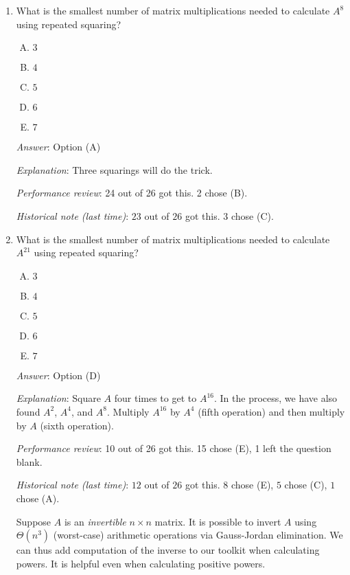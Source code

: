 \documentclass[10pt]{amsart}
\begin{document}
\begin{enumerate}
  {\em Historical note (last time)}: $21$ out of $26$ got this. $3$ chose (C),
  $2$ chose (A).
\item What is the smallest number of matrix multiplications needed to
  calculate $A^8$ using repeated squaring?

  \begin{enumerate}[(A)]
  \item $3$
  \item $4$
  \item $5$
  \item $6$
  \item $7$
  \end{enumerate}

  {\em Answer}: Option (A)

  {\em Explanation}: Three squarings will do the trick.

  {\em Performance review}: 24 out of 26 got this. 2 chose (B).

  {\em Historical note (last time)}: $23$ out of $26$ got this. $3$ chose (C).

\item What is the smallest number of matrix multiplications needed to
  calculate $A^{21}$ using repeated squaring?

  \begin{enumerate}[(A)]
  \item $3$
  \item $4$
  \item $5$
  \item $6$
  \item $7$
  \end{enumerate}

  {\em Answer}: Option (D)

  {\em Explanation}: Square $A$ four times to get to $A^{16}$. In the
  process, we have also found $A^2$, $A^4$, and $A^8$. Multiply
  $A^{16}$ by $A^4$ (fifth operation) and then multiply by $A$ (sixth
  operation).

  {\em Performance review}: 10 out of 26 got this. 15 chose (E), 1
  left the question blank.

  {\em Historical note (last time)}: $12$ out of $26$ got this. $8$ chose (E),
  $5$ chose (C), $1$ chose (A).

  \vspace{1in}

  Suppose $A$ is an {\em invertible} $n \times n$ matrix. It is
  possible to invert $A$ using $\Theta(n^3)$ (worst-case) arithmetic
  operations via Gauss-Jordan elimination. We can thus add computation
  of the inverse to our toolkit when calculating powers. It is helpful
  even when calculating positive powers.


\end{enumerate}
\end{document}
